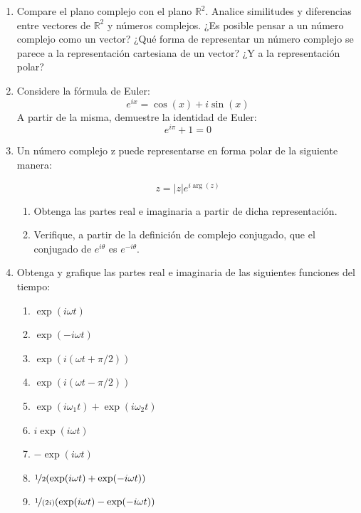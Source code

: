 \documentclass[11pt,spanish]{article}
\begin{document}
\begin{enumerate}

    \item Compare el plano complejo con el plano $\mathbb{R}^2$. Analice similitudes y diferencias entre vectores de $\mathbb{R}^2$ y números complejos. ¿Es posible pensar a un número complejo como un vector? ¿Qué forma de representar un número complejo se parece a la representación cartesiana de un vector? ¿Y a la representación polar?


    \item Considere la fórmula de Euler:
    $$e^{ix} = \cos(x) + i \sin(x)$$
    A partir de la misma, demuestre la identidad de Euler:
    $$e^{i\pi} + 1 = 0$$
    

    \item Un número complejo z puede representarse en forma polar de la siguiente manera:

    $$z = |z|e^{i \arg(z)}$$

    \begin{enumerate}
        \item Obtenga las partes real e imaginaria a partir de dicha representación.
        
        \item Verifique, a partir de la definición de complejo conjugado, que el conjugado de $e^{i \theta}$ es $e^{-i \theta}$.
    \end{enumerate}
    


    \item Obtenga y grafique las partes real e imaginaria de las siguientes funciones del tiempo:

    \begin{enumerate}
        \item $\exp(i \omega t)$
        \item $\exp(-i \omega t)$
        \item $\exp(i (\omega t + \pi/2))$
        \item $\exp(i (\omega t - \pi/2))$
        \item $\exp(i \omega_1 t) + \exp(i \omega_2 t) $
        \item $i \exp(i \omega t)$
        \item $-\exp(i \omega t)$
        \item $\nicefrac{1}{2} (\exp(i \omega t) + \exp(-i \omega t))$
        \item $\nicefrac{1}{(2i)} (\exp(i \omega t) - \exp(-i \omega t))$
    \end{enumerate}


\end{enumerate}
\end{document}
